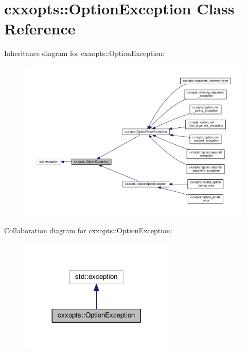 \hypertarget{classcxxopts_1_1OptionException}{}\section{cxxopts\+:\+:Option\+Exception Class Reference}
\label{classcxxopts_1_1OptionException}


Inheritance diagram for cxxopts\+:\+:Option\+Exception\+:
\nopagebreak
\begin{figure}[H]
\begin{center}
\leavevmode
\includegraphics[width=350pt]{classcxxopts_1_1OptionException__inherit__graph}
\end{center}
\end{figure}


Collaboration diagram for cxxopts\+:\+:Option\+Exception\+:
\nopagebreak
\begin{figure}[H]
\begin{center}
\leavevmode
\includegraphics[width=209pt]{classcxxopts_1_1OptionException__coll__graph}
\end{center}
\end{figure}
